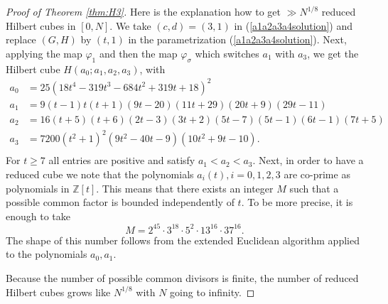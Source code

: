 \documentclass[10pt]{amsart}
\theoremstyle{plain}
\def\bbb{\mathbb}
\renewcommand{\phi}{\varphi}
\newcommand{\Z}{\bbb{Z}}
\begin{document}
\begin{proof}[Proof of Theorem \ref{thm:H3}] Here is the explanation how to get $\gg N^{1/8}$ reduced Hilbert cubes in $[0, N]$. We take $(c,d)=(3,1)$ in (\ref{a1a2a3a4solution}) and replace $(G,H)$ by $(t,1)$ in the parametrization (\ref{a1a2a3a4solution}). Next, applying the map $\phi_{1}$ and then the map $\phi_{\sigma}$ which switches $a_{1}$ with $a_{3}$, we get the Hilbert cube $H(a_{0}; a_{1}, a_{2}, a_{3})$, with
\begin{align*}
a_{0}&=25 \left(18 t^4-319 t^3-684 t^2+319 t+18\right)^2 \\
a_{1}&=9 (t-1) t (t+1) (9 t-20) (11 t+29) (20 t+9) (29 t-11)\\
a_{2}&= 16 (t+5)(t+6)(2t-3)(3t+2)(5t-7)(5t-1) (6 t-1) (7 t+5) \\
a_{3}&=7200(t^2+1)^2(9 t^2-40 t-9)(10 t^2+9 t-10).  \\
\end{align*}
For $t\geq 7$ all entries are positive and satisfy $a_{1}<a_{2}<a_{3}$. Next, in order to have a reduced cube we note that the polynomials $a_{i}(t), i=0, 1, 2, 3$ are co-prime as polynomials in $\Z[t]$. This means that there exists an integer $M$ such that a possible common factor is bounded independently of $t$. To be more precise, it is enough to take 
$$
M=2^{45}\cdot 3^{18}\cdot 5^{2}\cdot 13^{16}\cdot 37^{16}.
$$
The shape of this number follows from the extended Euclidean algorithm applied to the polynomials $a_{0},a_{1}$. 

Because the number of possible common divisors is finite, the number of reduced Hilbert cubes grows like $N^{1/8}$ with $N$ going to infinity.
\end{proof}




\end{document}
